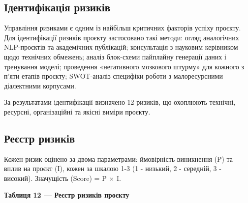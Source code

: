 \documentclass[14pt]{extarticle}
\begin{document}
\subsection{Ідентифікація ризиків}

Управління ризиками є одним із найбільш критичних факторів успіху проєкту. Для ідентифікації ризиків проєкту застосовано такі методи: огляд аналогічних NLP-проєктів та академічних публікацій; консультація з науковим керівником щодо технічних обмежень; аналіз блок-схеми пайплайну генерації даних і тренування моделі; проведення «негативного мозкового штурму» для кожного з п'яти етапів проєкту; SWOT-аналіз специфіки роботи з мало\-ресурсними діалектними корпусами.

За результатами ідентифікації визначено 12 ризиків, що охоплюють технічні, ресурсні, організаційні та якісні виміри проєкту.

\subsection{Реєстр ризиків}

Кожен ризик оцінено за двома параметрами: ймовірність виникнення (P) та вплив на проєкт (I), кожен за шкалою 1-3 (1 - низький, 2 - середній, 3 - високий). Значущість (Score) = P $\times$ I.

\vspace{6pt}
\noindent\textbf{Таблиця 12 --- Реєстр ризиків проєкту}
\end{document}
